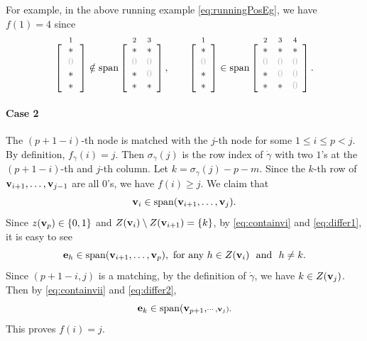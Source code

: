 \documentclass[12pt,reqno]{amsart}
\numberwithin{equation}{section}
\theoremstyle{definition}
\begin{document}
For example, in the above running example \eqref{eq:runningPosEg}, we have $f(1)=4$ since
$$\def\O{\color{lightgray}0}\def\X{*}
\def\ind#1#2{\raisebox{0pc}[0pc][0pc]{%
    $\stackrel{#1}{\vphantom{\frac12}#2}$\vphantom{#2}}}
\begin{matrix}\\[-1ex]
\left[\begin{array}{c}
\ind{1}{\X}\\\O\\\X\\\,\X\,
\end{array}\right]
\notin
\operatorname{span}
\left[\begin{array}{cc}
\ind{2}{\X}&\ind{3}\X\\
\O&\O\\
\X&\O\\
\X&\X\\
\end{array}\right],\qquad 
\left[\begin{array}{c}
\ind{1}{\X}\\\O\\\X\\\X
\end{array}\right]
\in
\operatorname{span}
\left[\begin{array}{ccc}
\ind{2}{\X}&\ind{3}{\X}&\ind{4}{\X}\\
\O&\O&\O\\
\X&\O&\O\\
\X&\X&\O\\
\end{array}\right].
\end{matrix}$$


\paragraph{\bf Case 2}
The $(p+1-i)$-th node is matched with the $j$-th node for some $1\leq i\leq p<j$. By definition, $f_\gamma(i)=j$. 
Then $\sigma_\gamma(j)$ is the row index of  $\dot{\gamma}$ with two $1$'s at the $(p+1-i)$-th and $j$-th column. Let $k=\sigma_\gamma(j)-p-m$.  
Since the $k$-th row of 
$\mathbf{v}_{i+1},\ldots,\mathbf{v}_{j-1}$ are all $0$'s, we have $f(i)\geq j$. 
We claim that 
$$\mathbf{v}_i\in \operatorname{span}(\mathbf{v}_{i+1},\ldots,\mathbf{v}_{j}).$$
Since $z(\mathbf{v}_p)\in \{0,1\}$ and $Z(\mathbf{v}_{i})\setminus Z(\mathbf{v}_{i+1})=\{k\}$, by \eqref{eq:containvi} and \eqref{eq:differ1}, it is easy to see  
$$\mathbf{e}_h \in \operatorname{span}(\mathbf{v}_{i+1},\ldots,\mathbf{v}_p), \text{ for any } h\in Z(\mathbf{v}_{i})\ \text{ and }\ h\neq k . $$
Since $(p+1-i,j)$ is a matching, by the definition of $\dot{\gamma}$, we have $k\in Z(\mathbf{v}_j)$. Then by \eqref{eq:containvii} and \eqref{eq:differ2},  
$$\mathbf{e}_{k}\in \operatorname{span}(\mathbf{v}_{p+1},\scriptstyle\cdots,\mathbf{v}_j).$$
This proves $f(i)=j$. 
\end{document}
